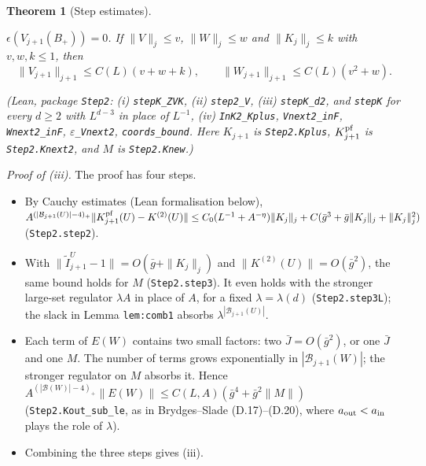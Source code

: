 \documentclass[11pt]{amsart}
\newtheorem{theorem}{Theorem}[section]
\theoremstyle{definition}
\theoremstyle{remark}
\numberwithin{equation}{section}
\newcommand{\cB}{\mathcal{B}}
\begin{document}
\begin{theorem}[Step estimates]
\begin{enumerate}
  $\epsilon(V_{j+1}(B_+))=0$. If $\|V\|_j\le v$, $\|W\|_j\le w$ and $\|K_j\|_j\le k$ with
  $v,w,k\le1$, then
  \[
    \|V_{j+1}\|_{j+1}\le C(L)(v+w+k),\qquad\|W_{j+1}\|_{j+1}\le C(L)(v^2+w).
  \]
\end{enumerate}
(Lean, package \texttt{Step2}: (i) \texttt{stepK\_ZVK}, (ii) \texttt{step2\_V}, (iii)
\texttt{stepK\_d2}, and \texttt{stepK} for every $d\ge2$ with $L^{d-3}$ in place of $L^{-1}$, (iv)
\texttt{InK2\_Kplus}, \texttt{Vnext2\_inF}, \texttt{Wnext2\_inF}, \texttt{$\varepsilon$\_Vnext2},
\texttt{coords\_bound}. Here $K_{j+1}$ is \texttt{Step2.Kplus}, $K^{\rm pf}_{j+1}$ is
\texttt{Step2.Knext2}, and $M$ is \texttt{Step2.Knew}.)
\end{theorem}


\emph{Proof of (iii).} The proof has four steps.
\begin{itemize}
\item By Cauchy estimates (Lean formalisation below),
  $A^{(|\cB_{j+1}(U)|-4)_+}\|K^{\rm pf}_{j+1}(U)-K^{(2)}(U)\|\le
  C_0(L^{-1}+A^{-\eta})\|K_j\|_j+C(\bar g^3+\bar g\|K_j\|_j+\|K_j\|_j^2)$
  (\texttt{Step2.step2}).
\item With $\|\tilde I^U_{j+1}-1\|=O(\bar g+\|K_j\|_j)$ and $\|K^{(2)}(U)\|=O(\bar g^2)$, the same
  bound holds for $M$ (\texttt{Step2.step3}). It even holds with the stronger large-set regulator
  $\lambda A$ in place of $A$, for a fixed $\lambda=\lambda(d)$ (\texttt{Step2.step3L}); the slack
  in Lemma \texttt{lem:comb1} absorbs $\lambda^{|\cB_{j+1}(U)|}$.
\item Each term of $E(W)$ contains two small factors: two $\bar J=O(\bar g^2)$, or one $\bar J$
  and one $M$. The number of terms grows exponentially in $|\cB_{j+1}(W)|$; the stronger
  regulator on $M$ absorbs it. Hence
  $A^{(|\cB(W)|-4)_+}\|E(W)\|\le C(L,A)(\bar g^4+\bar g^2\|M\|)$ (\texttt{Step2.Kout\_sub\_le},
  as in Brydges--Slade (D.17)--(D.20), where $a_{\rm out}<a_{\rm in}$ plays the role of
  $\lambda$).
\item Combining the three steps gives (iii).
\end{itemize}
\end{document}
